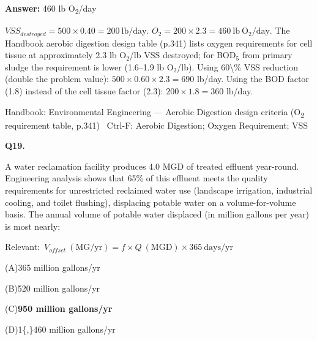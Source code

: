\documentclass[11pt]{article}
\newcommand{\correct}[1]{\textbf{#1}\;{\color{accent}$\checkmark$}}
\newcommand{\optline}[2]{\par\noindent\hspace{1.2em}(#1)\hspace{0.6em}#2}
\begin{document}
\vspace{2pt}\par\noindent\colorbox{boxbg}{\parbox{\dimexpr\linewidth-2\fboxsep\relax}{%
\vspace{2pt}\textbf{Answer:} 460 lb O\textsubscript{2}/day\par\vspace{2pt}
{\small $VSS_{destroyed} = 500\times0.40 = 200\ \mathrm{lb/day}$.  $O_2 = 200\times2.3 = 460\ \mathrm{lb\ O_2/day}$. The Handbook aerobic digestion design table (p.341) lists oxygen requirements for cell tissue at approximately 2.3 lb O$_2$/lb VSS destroyed; for BOD$_5$ from primary sludge the requirement is lower (1.6--1.9 lb O$_2$/lb). Using 60\textbackslash{}\% VSS reduction (double the problem value): $500\times0.60\times2.3 = 690$ lb/day. Using the BOD factor (1.8) instead of the cell tissue factor (2.3): $200\times1.8 = 360$ lb/day.}\par\vspace{2pt}
{\footnotesize\color{soft}Handbook: Environmental Engineering --- Aerobic Digestion design criteria (O\textsubscript{2} requirement table, p.341) \textbullet\ Ctrl-F: Aerobic Digestion; Oxygen Requirement; VSS}\vspace{2pt}
}}
\vspace{9pt}
\filbreak
\textbf{\color{accent}Q19.}\par\vspace{2pt}
A water reclamation facility produces 4.0 MGD of treated effluent year-round. Engineering analysis shows that 65\% of this effluent meets the quality requirements for unrestricted reclaimed water use (landscape irrigation, industrial cooling, and toilet flushing), displacing potable water on a volume-for-volume basis. The annual volume of potable water displaced (in million gallons per year) is most nearly:\par\vspace{3pt}
{\small\color{soft}Relevant:}\ $V_{offset}\ (\mathrm{MG/yr}) = f\times Q\ (\mathrm{MGD})\times 365\ \mathrm{days/yr}$\par\vspace{3pt}
\optline{A}{365 million gallons/yr}
\optline{B}{520 million gallons/yr}
\optline{C}{\correct{950 million gallons/yr}}
\optline{D}{1\{,\}460 million gallons/yr}
\par\vspace{3pt}
\end{document}
